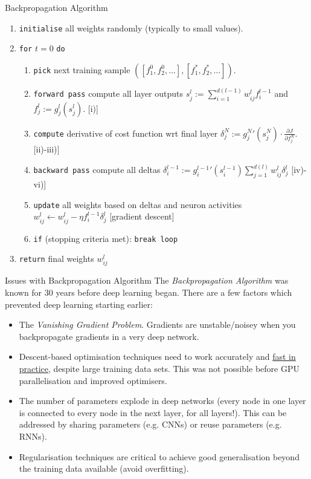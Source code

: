 \documentclass[11pt,a4paper]{article}
\begin{document}
  \begin{proposition}{Backpropagation Algorithm}
    \begin{enumerate}
      \item \texttt{initialise} all weights randomly (typically to small values).
      \item \texttt{for} $t=0$ \texttt{do}
      \begin{enumerate}
        \item \texttt{pick} next training sample $([f_1^0,f_2^0,\dots],[f_1^*,f_2^*,\dots])$.
        \item \texttt{forward pass} compute all layer outputs $\displaystyle s_j^l:=\sum_{i=1}^{d(l-1)}w_{ij}^lf_i^{l-1}$ and $\displaystyle f_j^l:=g_j^l(s_j^l)$. [i)]
        \item \texttt{compute} derivative of cost function wrt final layer $\delta_j^N:=g_j^N'(s_j^N)\cdot \frac{\partial J}{\partial f_j^N}$. [ii)-iii)]
        \item \texttt{backward pass} compute all deltas $\delta_i^{l-1}:=\displaystyle g_i^{l-1}'(s_i^{l-1})\sum_{j=1}^{d(l)}w_{ij}^l\delta_j^l$ [iv)-vi)]
        \item \texttt{update} all weights based on deltas and neuron activities $w_{ij}^l\leftarrow w_{ij}^l-\eta f_i^{l-1}\delta_j^l$ [gradient descent]
        \item \texttt{if} (stopping criteria met): \texttt{break loop}
      \end{enumerate}
      \item \texttt{return} final weights $w_{ij}^l$
    \end{enumerate}
  \end{proposition}

  \begin{remark}{Issues with Backpropagation Algorithm}
    The \textit{Backpropagation Algorithm} was known for 30 years before deep learning began. There are a few factors which prevented deep learning starting earlier:
    \begin{itemize}
      \item The \textit{Vanishing Gradient Problem}. Gradients are unstable/noisey when you backpropagate gradients in a very deep network.
      \item Descent-based optimisation techniques need to work accurately and \underline{fast in practice}, despite large training data sets. This was not possible before GPU parallelisation and improved optimisers.
      \item The number of parameters explode in deep networks (every node in one layer is connected to every node in the next layer, for all layers!). This can be addressed by sharing parameters (e.g. CNNs) or reuse parameters (e.g. RNNs).
      \item Regularisation techniques are critical to achieve good generalisation beyond the training data available (avoid overfitting).
    \end{itemize}
  \end{remark}
\end{document}
